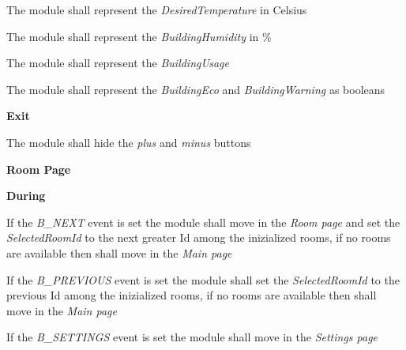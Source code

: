 \begin{req_enum}
\begin{req_enum}[label*=\arabic*.]
\begin{req_enum}[label*=\arabic*.]
\begin{req_enum}[label*=\arabic*.]
								\item The module shall represent the \textit{DesiredTemperature} in Celsius\degree \\
								\item The module shall represent the \textit{BuildingHumidity} in \% \\
								\item The module shall represent the \textit{BuildingUsage} \\
								\item The module shall represent the \textit{BuildingEco} and \textit{BuildingWarning} as booleans \\
							\end{req_enum}
							\item \textbf{Exit}
							\begin{req_enum}[label*=\arabic*.]
								\item The module shall hide the \textit{plus} and \textit{minus} buttons
							\end{req_enum}	
						\end{req_enum}

					\item \textbf{Room Page}
						\begin{req_enum}[label*=\arabic*.]
							\item \textbf{During}
							\begin{req_enum}[label*=\arabic*.]
								\item If the \textit{B\_NEXT} event is set the module shall move in the \textit{Room page} and set the \textit{SelectedRoomId} to the next greater Id among the inizialized rooms, if no rooms are available then shall move in the \textit{Main page} \\
								\item If the \textit{B\_PREVIOUS} event is set the module shall set the \textit{SelectedRoomId} to the previous Id among the inizialized rooms, if no rooms are available then shall move in the \textit{Main page} \\
								\item If the \textit{B\_SETTINGS} event is set the module shall move in the \textit{Settings page}


\end{req_enum}
\end{req_enum}
\end{req_enum}
\end{req_enum}
